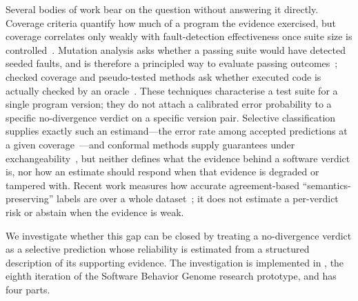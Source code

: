Several bodies of work bear on the question without answering it directly. Coverage criteria quantify how much of a program the evidence exercised, but coverage correlates only weakly with fault-detection effectiveness once suite size is controlled~\cite{inozemtseva2014coverage,gopinath2014code,kochhar2015code}. Mutation analysis asks whether a passing suite would have detected seeded faults, and is therefore a principled way to evaluate passing outcomes~\cite{jia2011analysis,just2014mutants,papadakis2019mutation}; checked coverage and pseudo-tested methods ask whether executed code is actually checked by an oracle~\cite{schuler2011assessing,niedermayr2016will,veraperez2019comprehensive}. These techniques characterise a test suite for a single program version; they do not attach a calibrated error probability to a specific no-divergence verdict on a specific version pair. Selective classification supplies exactly such an estimand---the error rate among accepted predictions at a given coverage~\cite{elyaniv2010foundations,geifman2017selective}---and conformal methods supply guarantees under exchangeability~\cite{angelopoulos2024conformal,bates2021distribution}, but neither defines what the evidence behind a software verdict is, nor how an estimate should respond when that evidence is degraded or tampered with. Recent work measures how accurate agreement-based ``semantics-preserving'' labels are over a whole dataset~\cite{ayub2026semadiff}; it does not estimate a per-verdict risk or abstain when the evidence is weak.

We investigate whether this gap can be closed by treating a no-divergence verdict as a selective prediction whose reliability is estimated from a structured description of its supporting evidence. The investigation is implemented in \sbg{}, the eighth iteration of the Software Behavior Genome research prototype, and has four parts.

